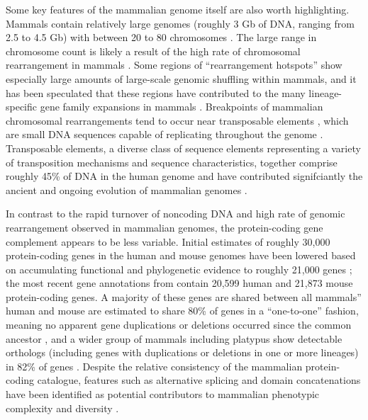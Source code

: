 Some key features of the mammalian genome itself are also worth
highlighting. Mammals contain relatively large genomes (roughly 3 Gb
of DNA, ranging from 2.5 to 4.5 Gb) with between 20 to 80 chromosomes
\citep{Bachmann1972}. The large range in chromosome count is likely a
result of the high rate of chromosomal rearrangement in mammals
\citep{Eichler2003,Pevzner2003}. Some regions of ``rearrangement
hotspots'' show especially large amounts of large-scale genomic
shuffling within mammals, and it has been speculated that these
regions have contributed to the many lineage-specific gene family
expansions in mammals \citep{Eichler2003}. Breakpoints of mammalian
chromosomal rearrangements tend to occur near transposable elements
\citep{Zhao2009}, which are small DNA sequences capable of replicating
throughout the genome \citep{Lander2001}. Transposable elements, a
diverse class of sequence elements representing a variety of
transposition mechanisms and sequence characteristics, together
comprise roughly 45\% of DNA in the human genome and have contributed
signifciantly the ancient and ongoing evolution of mammalian genomes
\citep{Lander2001,Cordaux2009}.

In contrast to the rapid turnover of noncoding DNA and high rate of
genomic rearrangement observed in mammalian genomes, the
protein-coding gene complement appears to be less variable. Initial
estimates of roughly 30,000 protein-coding
\citep{Lander2001,Mouse2002Initial} genes in the human and mouse
genomes have been lowered based on accumulating functional and
phylogenetic evidence to roughly 21,000 genes \citep{Macaque2007}; the
most recent gene annotations from \ens \citep{Flicek2011} contain
20,599 human and 21,873 mouse protein-coding genes. A majority of
these genes are shared between all mammals'' human and mouse are
estimated to share 80\% of genes in a ``one-to-one'' fashion, meaning
no apparent gene duplications or deletions occurred since the common
ancestor \citep{Mouse2002Initial}, and a wider group of mammals
including platypus show detectable orthologs (including genes with
duplications or deletions in one or more lineages) in 82\% of genes
\citep{Warren2008b}. Despite the relative consistency of the mammalian
protein-coding catalogue, features such as alternative splicing and
domain concatenations have been identified as potential contributors
to mammalian phenotypic complexity and diversity \citep{Lander2001}.

